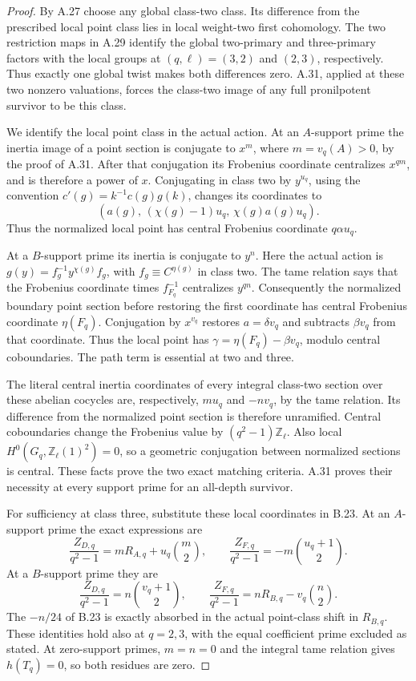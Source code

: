 \begin{proof}
By A.27 choose any global class-two class. Its difference from the
prescribed local point class lies in local weight-two first cohomology.
The two restriction maps in A.29 identify the global two-primary and
three-primary factors with the local groups at $(q,\ell)=(3,2)$ and
$(2,3)$, respectively. Thus exactly one global twist makes both
differences zero. A.31, applied at these two nonzero valuations,
forces the class-two image of any full pronilpotent survivor to be
this class.

We identify the local point class in the actual action. At an
$A$-support prime the inertia image of a point section is conjugate
to $x^m$, where $m=v_q(A)>0$, by the proof of A.31. After that
conjugation its Frobenius coordinate centralizes $x^{qm}$, and is
therefore a power of $x$. Conjugating in class two by $y^{u_q}$,
using the convention $c'(g)=k^{-1}c(g)g(k)$, changes its
coordinates to
\[
       (a(g),\, (\chi(g)-1)u_q,\, \chi(g)a(g)u_q).
\]
Thus the normalized local point has central Frobenius coordinate
$q\alpha u_q$.

At a $B$-support prime its inertia is conjugate to $y^n$.
Here the actual action is
$g(y)=f_g^{-1}y^{\chi(g)}f_g$, with
$f_g\equiv C^{\eta(g)}$ in class two. The tame relation says that
the Frobenius coordinate times $f_{F_q}^{-1}$ centralizes $y^{qn}$.
Consequently the normalized boundary point section before restoring
the first coordinate has central Frobenius coordinate $\eta(F_q)$.
Conjugation by $x^{v_q}$ restores $a=\delta v_q$ and subtracts
$\beta v_q$ from that coordinate. Thus the local point has
$\gamma=\eta(F_q)-\beta v_q$, modulo central coboundaries.
The path term is essential at two and three.

The literal central inertia coordinates of every integral class-two
section over these abelian cocycles are, respectively, $m u_q$ and
$-n v_q$, by the tame relation. Its difference from the normalized
point section is therefore unramified. Central coboundaries change
the Frobenius value by $(q^2-1)\mathbb Z_\ell$. Also local
$H^0(G_q,\mathbb Z_\ell(1)^2)=0$, so a geometric conjugation
between normalized sections is central. These facts prove the two
exact matching criteria. A.31 proves their necessity at every support
prime for an all-depth survivor.

For sufficiency at class three, substitute these local coordinates
in B.23. At an $A$-support prime the exact expressions are
\[
 \frac{Z_{D,q}}{q^2-1}=m R_{A,q}+u_q\binom m2,
 \qquad
 \frac{Z_{F,q}}{q^2-1}=-m\binom{u_q+1}{2}.
\]
At a $B$-support prime they are
\[
 \frac{Z_{D,q}}{q^2-1}=n\binom{v_q+1}{2},
 \qquad
 \frac{Z_{F,q}}{q^2-1}=n R_{B,q}-v_q\binom n2.
\]
The $-n/24$ of B.23 is exactly absorbed in the actual point-class
shift in $R_{B,q}$. These identities hold also at $q=2,3$, with
the equal coefficient prime excluded as stated. At zero-support
primes, $m=n=0$ and the integral tame relation gives $h(T_q)=0$,
so both residues are zero.


\end{proof}
